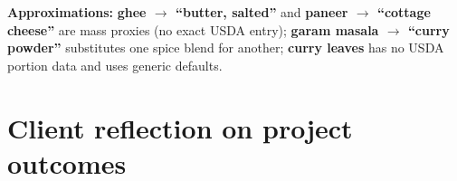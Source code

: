 \documentclass{article}
\begin{document}
\noindent\textbf{Approximations:} \textbf{ghee $\rightarrow$ ``butter, salted''} and \textbf{paneer $\rightarrow$ ``cottage cheese''} are mass proxies (no exact USDA entry); \textbf{garam masala $\rightarrow$ ``curry powder''} substitutes one spice blend for another; \textbf{curry leaves} has no USDA portion data and uses generic defaults.

\section{Client reflection on project outcomes}
\end{document}
